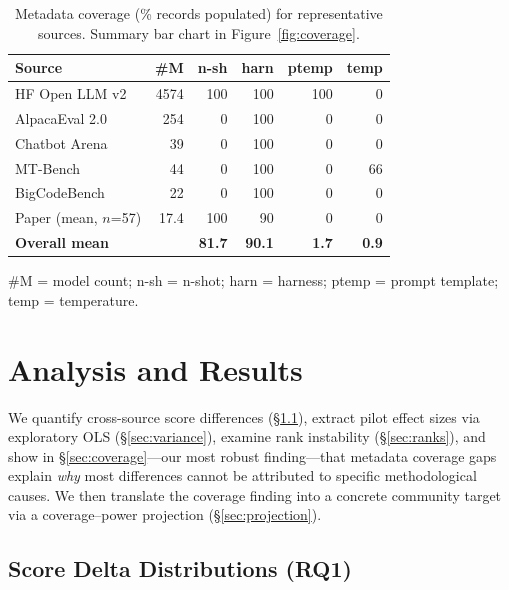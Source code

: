 \documentclass[11pt]{article}
\begin{document}
\begin{table}[t]
\centering
\small
\setlength{\tabcolsep}{3.5pt}
\caption{Metadata coverage (\% records populated) for representative
sources. Summary bar chart in Figure~\ref{fig:coverage}.}
\label{tab:coverage}
\begin{tabular}{lrrrrr}
\toprule
\textbf{Source} & \textbf{\#M} & \textbf{n-sh} & \textbf{harn} & \textbf{ptemp} & \textbf{temp} \\
\midrule
HF Open LLM v2         & 4574 & 100 & 100 & 100 & 0 \\
AlpacaEval 2.0         &  254 &   0 & 100 &   0 & 0 \\
Chatbot Arena          &   39 &   0 & 100 &   0 & 0 \\
MT-Bench               &   44 &   0 & 100 &   0 & 66 \\
BigCodeBench           &   22 &   0 & 100 &   0 & 0 \\
Paper (mean, $n$=57)   & 17.4 & 100 &  90 &   0 & 0 \\
\midrule
\textbf{Overall mean}  &      & \textbf{81.7} & \textbf{90.1} & \textbf{1.7} & \textbf{0.9} \\
\bottomrule
\end{tabular}
\vspace{-2pt}
\footnotesize
\#M = model count; n-sh = n-shot; harn = harness; ptemp = prompt template; temp = temperature.
\end{table}

\section{Analysis and Results}

We quantify cross-source score differences (\S\ref{sec:deltas}),
extract pilot effect sizes via exploratory OLS (\S\ref{sec:variance}),
examine rank instability (\S\ref{sec:ranks}), and show in
\S\ref{sec:coverage}---our most robust finding---that metadata coverage
gaps explain \emph{why} most differences cannot be attributed to specific
methodological causes.
We then translate the coverage finding into a concrete community target
via a coverage--power projection (\S\ref{sec:projection}).

\subsection{Score Delta Distributions (RQ1)}
\label{sec:deltas}
\end{document}
